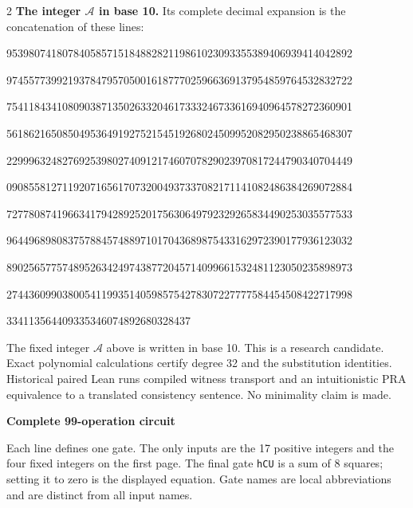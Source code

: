 \documentclass[10pt]{article}
\begin{document}
\begin{multicols}{2}
\textbf{The integer $\mathcal A$ in base 10.}
Its complete decimal expansion is the concatenation of these lines:\par
\begingroup\fontsize{7.7}{8.2}\selectfont{}\par
95398074180784058571518488282119861023093355389406939414042892\par
97455773992193784795705001618777025966369137954859764532832722\par
75411843410809038713502633204617333246733616940964578272360901\par
56186216508504953649192752154519268024509952082950238865468307\par
22999632482769253980274091217460707829023970817244790340704449\par
09085581271192071656170732004937337082171141082486384269072884\par
72778087419663417942892520175630649792329265834490253035577533\par
96449689808375788457488971017043689875433162972390177936123032\par
89025657757489526342497438772045714099661532481123050235898973\par
27443609903800541199351405985754278307227777584454508422717998\par
334113564409335346074892680328437\par
\endgroup
\normalfont\fontsize{7.7}{8.2}\selectfont
The fixed integer $\mathcal A$ above is written in base 10. This is a research
candidate. Exact polynomial calculations certify degree 32 and the
substitution identities. Historical paired Lean runs compiled witness
transport and an intuitionistic PRA equivalence to a translated consistency
sentence. No
minimality claim is made.
\end{multicols}
\clearpage
\begin{center}{\large\bfseries Complete 99-operation circuit}\end{center}
Each line defines one gate. The only inputs are the 17 positive integers and
the four fixed integers on the first page. The final gate \texttt{hCU} is a
sum of 8 squares; setting it to zero is the displayed equation. Gate names
are local abbreviations and are distinct from all input names.
\end{document}

